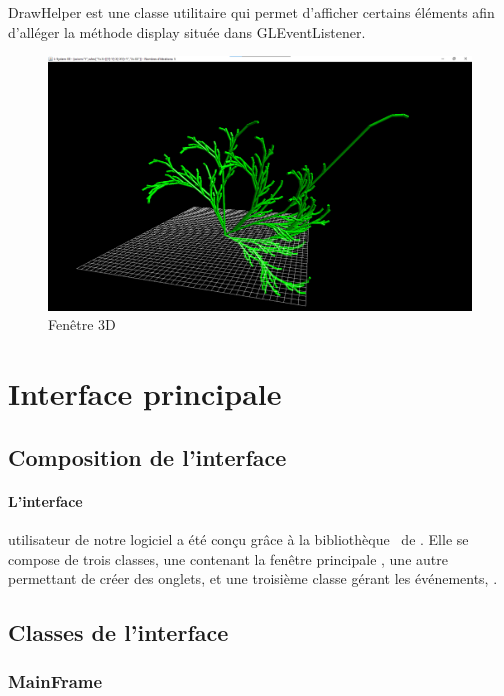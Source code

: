 DrawHelper est une classe utilitaire qui permet d'afficher certains éléments afin d'alléger la méthode display située dans GLEventListener.

\begin{figure}[h!]
    \centering
    \includegraphics[width=0.8\linewidth]{pics/3dGUI.png}
    \caption{Fenêtre 3D}
    \label{fig:3d_frame}
\end{figure}

\clearpage

\section{Interface principale}
\label{sec:menu}

\subsection{Composition de l'interface}

\paragraph{L'interface} utilisateur de notre logiciel a été conçu grâce à la bibliothèque \Swing \ de \Java. Elle se compose de trois classes, une contenant la fenêtre principale , une autre permettant de créer des onglets,  et une troisième classe gérant les événements, .
 
\subsection{Classes de l'interface}

\subsubsection{MainFrame}

